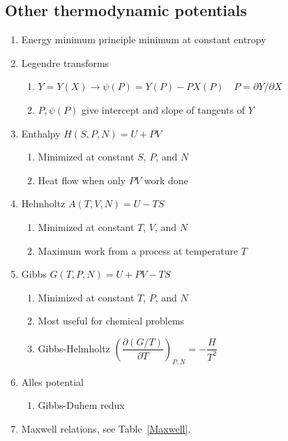 \documentclass[11pt]{article}
\begin{document}
\subsection{Other thermodynamic potentials}
\label{sec:org589ecac}
\begin{enumerate}
\item Energy minimum principle minimum at constant entropy
\item Legendre transforms
\begin{enumerate}
\item \(Y=Y(X) \rightarrow \psi(P) = Y(P)-PX(P) \quad P=\partial Y /\partial X\)
\item \(P,\psi(P)\) give intercept and slope of tangents of \(Y\)
\end{enumerate}
\item Enthalpy \(H(S,P,N) = U + PV\)
\begin{enumerate}
\item Minimized at constant \(S\), \(P\), and \(N\)
\item Heat flow when only \(PV\) work done
\end{enumerate}
\item Helmholtz \(A(T,V,N) = U - TS\)
\begin{enumerate}
\item Minimized at constant \(T\), \(V\), and \(N\)
\item Maximum work from a process at temperature \(T\)
\end{enumerate}
\item Gibbs \(G(T,P,N) = U + PV - TS\)
\begin{enumerate}
\item Minimized at constant \(T\), \(P\), and \(N\)
\item Most useful for chemical problems
\item Gibbs-Helmholtz \(\left ( \dfrac{\partial (G/T)}{\partial T} \right )_{P,N} = -\dfrac{H}{T^2}\)
\end{enumerate}
\item Alles potential
\begin{enumerate}
\item Gibbs-Duhem redux
\end{enumerate}
\item Maxwell relations, see Table~\ref{Maxwell}.
\end{enumerate}
\end{document}

